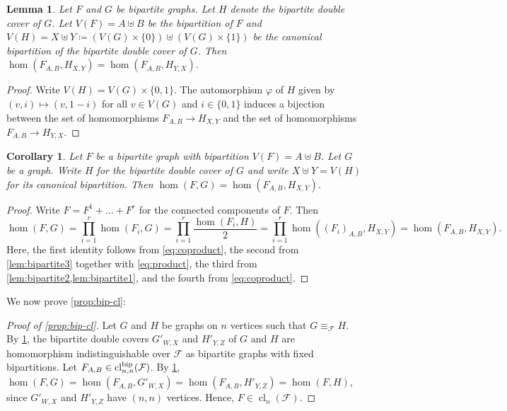 \documentclass[10pt,a4paper]{article}
\theoremstyle{definition}
\theoremstyle{plain}
\newtheorem{lemma}[definition]{Lemma}
\newtheorem{corollary}[definition]{Corollary}
\theoremstyle{remark}
\DeclareMathOperator{\cl}{cl}
\renewcommand{\phi}{\varphi}
\begin{document}
	
	\begin{lemma}\label{lem:bipartite2}
		Let $F$ and $G$ be bipartite graphs.
		Let $H$ denote the bipartite double cover of $G$.
		Let $V(F) = A \uplus B$ be the bipartition of $F$ and $V(H) = X \uplus Y \coloneqq (V(G) \times \{0\}) \uplus (V(G) \times \{1\})$ be the canonical bipartition of the bipartite double cover of $G$.
		Then
		$
		\hom(F_{A, B}, H_{X, Y})
		= \hom(F_{A, B}, H_{Y, X}).
		$
	\end{lemma}
	\begin{proof}
		Write $V(H) = V(G) \times \{0,1\}$. 
		The automorphism $\phi$ of $H$ given by $(v, i) \mapsto (v, 1-i)$ for all $v \in V(G)$ and $i \in \{0,1\}$ induces a bijection between the set of homomorphisms $F_{A, B}  \to H_{X, Y}$ and the set of homomorphisms $F_{A, B} \to H_{Y, X}$.
	\end{proof}
	
	\begin{corollary}\label{lem:double-cover-combined}
		Let $F$ be a bipartite graph with bipartition $V(F) = A \uplus B$.
		Let $G$ be a graph.
		Write $H$ for the bipartite double cover of $G$  
		and write $X \uplus Y = V(H)$ for its canonical bipartition.
		Then $\hom(F, G) = \hom(F_{A,B}, H_{X,Y})$.
	\end{corollary}
	\begin{proof}
		Write $F = F^1 + \dots+ F^r$ for the connected components of $F$.
		Then
		\[
			\hom(F, G)
			= \prod_{i =1}^r \hom(F_i, G)
			=  \prod_{i =1}^r \frac{\hom(F_i, H)}{2}
			= \prod_{i =1}^r  \hom((F_i)_{A, B}, H_{X, Y})
			= \hom(F_{A,B}, H_{X,Y}).
		\]
		Here, the first identity follows from \cref{eq:coproduct},
		the second from \cref{lem:bipartite3} together with \cref{eq:product},
		the third from \cref{lem:bipartite2,lem:bipartite1},
		and the fourth from \cref{eq:coproduct}.
	\end{proof}
	
	We now prove \cref{prop:bip-cl}:
	\begin{proof}[Proof of \cref{prop:bip-cl}]
		Let $G$ and $H$ be graphs on $n$ vertices
		such that $G \equiv_{\mathcal{F}} H$.
		By \cref{lem:double-cover-combined},
		the bipartite double covers $G'_{W, X}$ and $H'_{Y, Z}$ of $G$ and $H$
		are homomorphism indistinguishable over $\mathcal{F}$
		as bipartite graphs with fixed bipartitions.
		Let $F_{A,B} \in \cl_{n,n}^{\textup{bip}}(\mathcal{F})$.
		By \cref{lem:double-cover-combined}, 
		$\hom(F, G) = \hom(F_{A,B}, G'_{W, X}) = \hom(F_{A,B}, H'_{Y, Z}) = \hom(F, H)$,
		since $G'_{W,X}$ and $H'_{Y,Z}$ have $(n,n)$ vertices.
		Hence, $F \in \cl_n(\mathcal{F})$.
	\end{proof}
	
\end{document}
